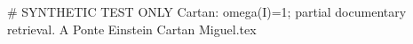# SYNTHETIC TEST ONLY
Cartan: omega(I)=1; partial documentary retrieval.
A Ponte Einstein Cartan Miguel.tex
